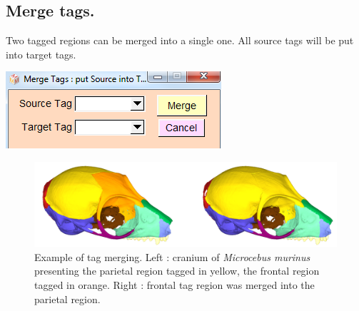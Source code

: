 \subsection{Merge tags.}
\noindent
\begin{minipage}{0.5\textwidth}
Two tagged regions can be merged into a single one. All source tags will be put into target tags. \end{minipage}    
\begin{minipage}{0.5\textwidth}\centering
  \includegraphics[scale=0.5]{images/Tags/Merge_tags.png}
 \end{minipage} 
\noindent
\begin{figure}
  \centering
  \includegraphics[scale=0.25]{images/Tags/Merge.png} 
	\caption{Example of tag merging. Left : cranium of \textit{Microcebus murinus} presenting the parietal region
tagged in yellow, the frontal region tagged in orange. Right : frontal tag region was merged into
the parietal region.}
\label{merge_tags}
\end{figure}